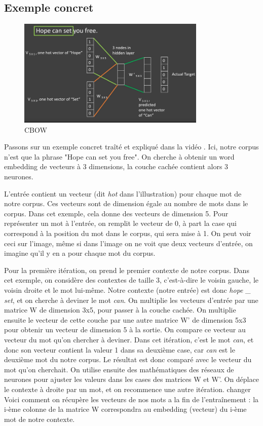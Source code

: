 \documentclass[11pt, a4paper]{report}
\begin{document}
\subsection{Exemple concret}
\begin{figure}[h]
  \centering
  \includegraphics[width=0.8\textwidth]{cbow.png}
  \caption{CBOW}
  \label{fig:cbow}
\end{figure}
Passons sur un exemple concret traîté et expliqué dans la vidéo 
\cite[\textit{Word2Vec - Skipgram and CBOW}, The Semicolon]{word2vec-semicolon}. 
Ici, notre corpus n'est que la phrase "Hope can set you free". On cherche à obtenir un word 
embedding de vecteurs à 3 dimensions, la couche cachée contient alors 3 neurones.

L'entrée 
contient un vecteur (dit \textit{hot} dans l'illustration) pour chaque mot de notre corpus. 
Ces vecteurs sont de dimension égale au nombre de mots dans le corpus. Dans cet exemple, cela 
donne des vecteurs de dimension 5. Pour représenter un mot à l'entrée, on remplit le vecteur 
de 0, à part la case qui correspond à la position du mot dans le corpus, qui sera mise à 1. 
On peut voir ceci sur l'image, même si dans l'image on ne voit que deux vecteurs d'entrée, 
on imagine qu'il y en a pour chaque mot du corpus. 

Pour la première itération, on prend le premier contexte de notre corpus. Dans cet exemple, 
on considère des contextes de taille 3, c'est-à-dire le voisin gauche, le voisin droite et le mot lui-même.
Notre contexte (notre entrée) est donc \textit{hope \_ set}, et on cherche à deviner le mot \textit{can}.
On multiplie les vecteurs d'entrée par une matrice W de dimension 3x5, pour passer à la couche cachée. 
On multiplie ensuite le vecteur de cette couche par une autre matrice W' de dimension 5x3 pour obtenir 
un vecteur de dimension 5 à la sortie. On compare ce vecteur au vecteur du mot qu'on chercher à deviner. 
Dans cet itération, c'est le mot \textit{can}, et donc son vecteur contient la valeur 1 dans sa deuxième 
case, car \textit{can} est le deuxième mot du notre corpus. Le résultat est donc comparé avec le vecteur 
du mot qu'on cherchait. On utilise ensuite des mathématiques des réseaux de neurones pour ajuster les 
valeurs dans les cases des matrices W et W'. On déplace le contexte à droite par un mot, et on recommence 
une autre itération. 
changer
Voici comment on récupère les vecteurs de nos mots a la fin de l'entraînement : la i-ème colonne de la 
matrice W correspondra au embedding (vecteur) du i-ème mot de notre contexte. 
\end{document}
